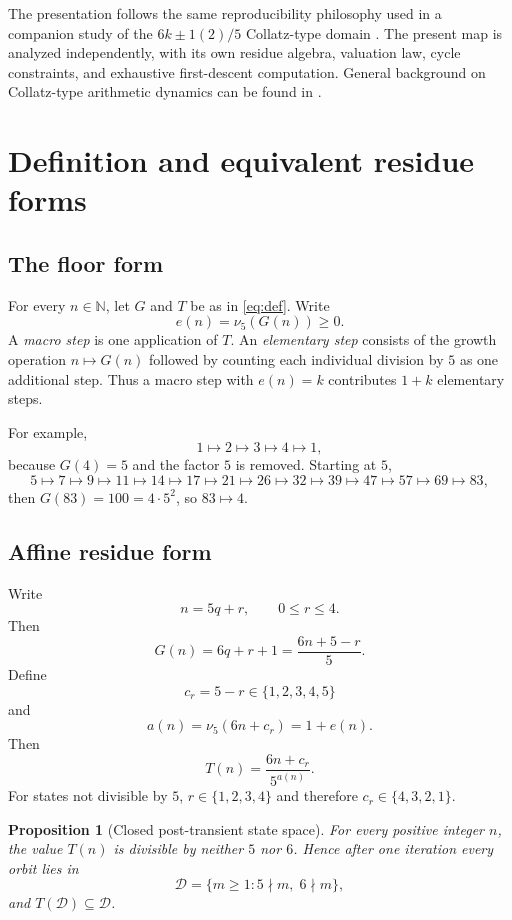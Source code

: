 \documentclass[11pt]{article}
\newtheorem{proposition}[theorem]{Proposition}
\theoremstyle{definition}
\newcommand{\nuFive}{\nu_5}
\newcommand{\D}{\mathcal{D}}
\begin{document}
The presentation follows the same reproducibility philosophy used in a companion study of the $6k\pm1(2)/5$ Collatz-type domain \cite{BanazadehCompanion}. The present map is analyzed independently, with its own residue algebra, valuation law, cycle constraints, and exhaustive first-descent computation. General background on Collatz-type arithmetic dynamics can be found in \cite{Lagarias1985,Lagarias2010}.

\section{Definition and equivalent residue forms}

\subsection{The floor form}

For every $n\in\mathbb N$, let $G$ and $T$ be as in \eqref{eq:def}. Write
\[
e(n)=\nuFive(G(n))\ge0.
\]
A \emph{macro step} is one application of $T$. An \emph{elementary step} consists of the growth operation $n\mapsto G(n)$ followed by counting each individual division by $5$ as one additional step. Thus a macro step with $e(n)=k$ contributes $1+k$ elementary steps.

For example,
\[
1\mapsto2\mapsto3\mapsto4\mapsto1,
\]
because $G(4)=5$ and the factor $5$ is removed. Starting at $5$,
\[
5\mapsto7\mapsto9\mapsto11\mapsto14\mapsto17\mapsto21\mapsto26
\mapsto32\mapsto39\mapsto47\mapsto57\mapsto69\mapsto83,
\]
then $G(83)=100=4\cdot5^2$, so $83\mapsto4$.

\subsection{Affine residue form}

Write
\[
n=5q+r,\qquad 0\le r\le4.
\]
Then
\begin{equation}
G(n)=6q+r+1=\frac{6n+5-r}{5}.
\label{eq:Gres}
\end{equation}
Define
\[
c_r=5-r\in\{1,2,3,4,5\}
\]
and
\[
a(n)=\nuFive(6n+c_r)=1+e(n).
\]
Then
\begin{equation}
T(n)=\frac{6n+c_r}{5^{a(n)}}.
\label{eq:affine}
\end{equation}
For states not divisible by $5$, $r\in\{1,2,3,4\}$ and therefore $c_r\in\{4,3,2,1\}$.

\begin{proposition}[Closed post-transient state space]
For every positive integer $n$, the value $T(n)$ is divisible by neither $5$ nor $6$. Hence after one iteration every orbit lies in
\[
\D=\{m\ge1:5\nmid m,\;6\nmid m\},
\]
and $T(\D)\subseteq\D$.
\end{proposition}
\end{document}
